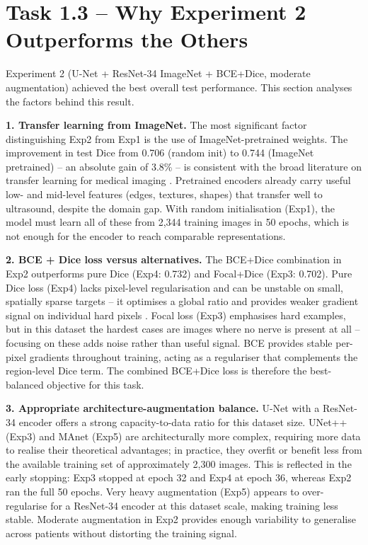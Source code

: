 \documentclass[11pt,a4paper]{article}
\begin{document}
\section{Task 1.3 -- Why Experiment 2 Outperforms the Others}

Experiment 2 (U-Net + ResNet-34 ImageNet + BCE+Dice, moderate augmentation)
achieved the best overall test performance. This section analyses the factors
behind this result.

\textbf{1. Transfer learning from ImageNet.}
The most significant factor distinguishing Exp2 from Exp1 is the use of
ImageNet-pretrained weights. The improvement in test Dice from 0.706 (random init)
to 0.744 (ImageNet pretrained) -- an absolute gain of 3.8\% -- is consistent with
the broad literature on transfer learning for medical imaging
\cite{tajbakhsh2016cnn, raghu2019transfusion}.
Pretrained encoders already carry useful low- and mid-level features (edges, textures,
shapes) that transfer well to ultrasound, despite the domain gap.
With random initialisation (Exp1), the model must learn all of these from 2,344
training images in 50 epochs, which is not enough for the encoder to reach comparable
representations.

\textbf{2. BCE + Dice loss versus alternatives.}
The BCE+Dice combination in Exp2 outperforms pure Dice (Exp4: 0.732) and Focal+Dice
(Exp3: 0.702).
Pure Dice loss (Exp4) lacks pixel-level regularisation and can be unstable on small,
spatially sparse targets -- it optimises a global ratio and provides weaker gradient
signal on individual hard pixels \cite{sudre2017generalised}.
Focal loss (Exp3) emphasises hard examples, but in this dataset the hardest cases are
images where no nerve is present at all -- focusing on these adds noise rather than
useful signal.
BCE provides stable per-pixel gradients throughout training, acting as a regulariser
that complements the region-level Dice term.
The combined BCE+Dice loss is therefore the best-balanced objective for this task.

\textbf{3. Appropriate architecture-augmentation balance.}
U-Net with a ResNet-34 encoder offers a strong capacity-to-data ratio for this
dataset size.
UNet++ (Exp3) and MAnet (Exp5) are architecturally more complex, requiring more data
to realise their theoretical advantages; in practice, they overfit or benefit less
from the available training set of approximately 2,300 images.
This is reflected in the early stopping: Exp3 stopped at epoch 32 and Exp4 at
epoch 36, whereas Exp2 ran the full 50 epochs.
Very heavy augmentation (Exp5) appears to over-regularise for a ResNet-34 encoder
at this dataset scale, making training less stable.
Moderate augmentation in Exp2 provides enough variability to generalise across
patients without distorting the training signal.
\end{document}
